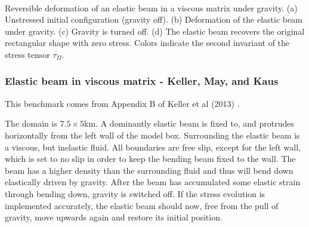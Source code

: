 \begin{center}
\\
{\captionfont 
Reversible deformation of an elastic beam in a viscous matrix under gravity. 
(a) Unstressed initial configuration (gravity off). 
(b) Deformation of the elastic beam under gravity. 
(c) Gravity is turned off. (d) The elastic beam recovers the original rectangular 
shape with zero stress. Colors indicate the second invariant of the stress 
tensor $\tau_{II}$.}
\end{center}



\subsubsection{Elastic beam in viscous matrix - Keller, May, and Kaus}


This benchmark comes from Appendix B of Keller et al (2013) \cite{kemk13}.

The domain is $7.5\times5$km. A dominantly elastic beam is fixed to, and protrudes horizontally 
from the left wall of the model box. 
Surrounding the elastic beam is a viscous, but inelastic fluid. 
All boundaries are free slip, except for the left wall, which is set to no slip in  
order to keep the bending beam fixed to the wall. The beam has a higher density than the surrounding fluid and 
thus will bend down elastically driven by gravity. After the beam has 
accumulated some elastic strain through bending down, gravity is switched off. 
If the stress evolution is implemented accurately, the elastic beam should now, 
free from the pull of gravity, move upwards again and restore its initial position. 

